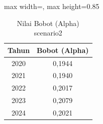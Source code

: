 \begin{table}[H]
\centering
\caption{Nilai Bobot (Alpha) scenario2} \label{tab:app2alpha}
\begin{adjustbox}{max width=\textwidth, max height=0.85\textheight}
\begin{tabular}{|c|c|}
\hline
\textbf{Tahun} & \textbf{Bobot (Alpha)} \\
\hline
2020 & 0,1944 \\
2021 & 0,1940 \\
2022 & 0,2017 \\
2023 & 0,2079 \\
2024 & 0,2021 \\
\hline
\end{tabular}
\end{adjustbox}
\end{table}